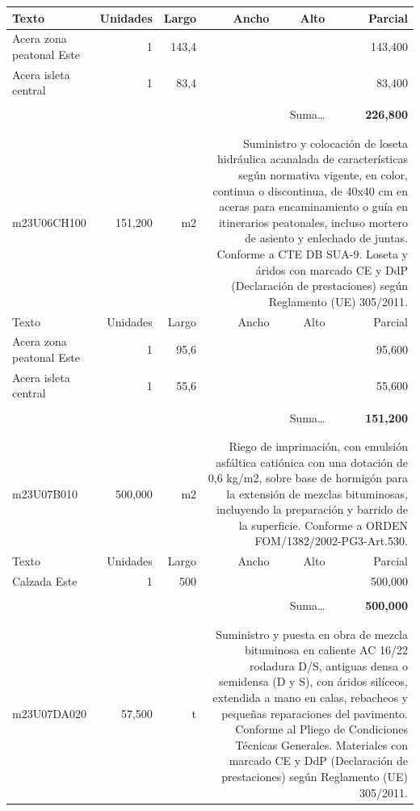 \documentclass{book}%
\begin{document}
\begin{longtable}{lrrrrr}
Texto&Unidades&Largo&Ancho&Alto&Parcial\\%
\hline%
\multicolumn{1}{p{3.5cm}}{Acera zona peatonal Este}&1&143,4&&&   143,400\\%
\multicolumn{1}{p{3.5cm}}{Acera isleta central}&1&83,4&&&    83,400\\%
&&&&&\\%
\multicolumn{5}{r}{Suma\ldots}&\textbf{   226,800}\\%
\hline%
&&&&&\\%
&&&&&\\%
m23U06CH100&   151,200& m2&\multicolumn{3}{p{6cm}}{\scriptsize Suministro y colocación de loseta hidráulica acanalada de características según normativa vigente, en color, continua o discontinua, de 40x40 cm en aceras para encaminamiento o guía en itinerarios peatonales, incluso mortero de asiento y enlechado de juntas. Conforme a CTE DB SUA-9. Loseta y áridos con marcado CE y DdP (Declaración de prestaciones) según Reglamento (UE) 305/2011.\normalsize}\\%
Texto&Unidades&Largo&Ancho&Alto&Parcial\\%
\hline%
\multicolumn{1}{p{3.5cm}}{Acera zona peatonal Este}&1&95,6&&&    95,600\\%
\multicolumn{1}{p{3.5cm}}{Acera isleta central}&1&55,6&&&    55,600\\%
&&&&&\\%
\multicolumn{5}{r}{Suma\ldots}&\textbf{   151,200}\\%
\hline%
&&&&&\\%
&&&&&\\%
m23U07B010&   500,000& m2&\multicolumn{3}{p{6cm}}{\scriptsize Riego de imprimación, con emulsión asfáltica catiónica con una dotación de 0,6 kg/m2, sobre base de hormigón para la extensión de mezclas bituminosas, incluyendo la preparación y barrido de la superficie. Conforme a ORDEN FOM/1382/2002-PG3-Art.530.\normalsize}\\%
Texto&Unidades&Largo&Ancho&Alto&Parcial\\%
\hline%
\multicolumn{1}{p{3.5cm}}{Calzada Este}&1&500&&&   500,000\\%
&&&&&\\%
\multicolumn{5}{r}{Suma\ldots}&\textbf{   500,000}\\%
\hline%
&&&&&\\%
&&&&&\\%
m23U07DA020&    57,500& t&\multicolumn{3}{p{6cm}}{\scriptsize Suministro y puesta en obra de mezcla bituminosa en caliente AC 16/22 rodadura D/S, antiguas densa o semidensa (D y S), con áridos silíceos, extendida a mano en calas, rebacheos y pequeñas reparaciones del pavimento. Conforme al Pliego de Condiciones Técnicas Generales. Materiales con marcado CE y DdP (Declaración de prestaciones) según Reglamento (UE) 305/2011.\normalsize}\\%

\end{longtable}
\end{document}
